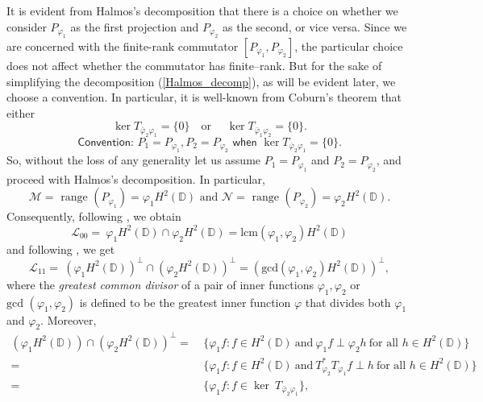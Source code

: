 \documentclass[12pt, a4 paper]{amsart}
\newcommand{\cll}{\mathcal{L}}
\newcommand{\clm}{\mathcal{M}}
\newcommand{\cln}{\mathcal{N}}
\newcommand{\D}{\mathbb{D}}
\theoremstyle{definition}
\theoremstyle{plain}
\theoremstyle{definition}
\numberwithin{equation}{section}
\let\phi=\varphi
\begin{document}
It is evident from Halmos's decomposition that there is a choice on whether we consider $P_{\phi_1}$  as the first projection and $P_{\phi_2}$ as the second, or vice versa. Since we are concerned with the finite-rank commutator $[P_{\phi_1}, P_{\phi_2}]$, the particular choice does not affect whether the commutator has finite--rank.  But for the sake of simplifying the decomposition (\ref{Halmos_decomp}), as will be evident later, we choose a convention. In particular, it is well-known from Coburn's theorem \cite{Coburn} that either
\[
\ker T_{\bar \phi_2 \phi_1} = \{0\} \quad \text{or }\quad \ker T_{\bar \phi_1 \phi_2} = \{0\}. 
\]
\begin{equation}\label{convention}
\textsf{Convention: } P_1 = P_{\phi_1}, P_2 = P_{\phi_2} \textsf{ when } 
\ker T_{\bar \phi_2 \phi_1} = \{0\}.
\end{equation}
So, without the loss of any generality let us assume $P_1 = P_{\phi_1}$ and $P_2 = P_{\phi_2}$, and proceed with Halmos's decomposition. In particular, 
\[
\clm=\text{ range } (P_{\phi_1})=\phi_1 H^2(\mathbb{D}) \text{ and } \cln=\text{ range }(P_{\phi_2})=\phi_2 H^2(\mathbb{D}).
\]
 Consequently, following \cite[Corollary 4.8]{GMR}, we obtain
\begin{equation*} 
    \cll_{00} =~\phi_1 H^2(\mathbb{D} )\cap\phi_2 H^2(\mathbb{D} )=\mbox{lcm}(\phi_1,\phi_2)H^2({\mathbb{D}} )
\end{equation*}
and following \cite[Corollary 5.9]{GMR}, we get
\begin{equation*}
 \cll_{11}=~\left(\phi_1 H^2(\mathbb{D} )\right)^{\perp}\cap\left(\phi_2 H^2(\mathbb{D} )\right)^{\perp}=\left(\mbox{gcd}(\phi_1, \phi_2)H^2({\mathbb{D}} )\right)^{\perp},
\end{equation*}
where the \textit{greatest common divisor} of a pair of inner functions $\phi_1, \phi_2$ or $\mbox{gcd }(\phi_1, \phi_2)$ is defined to be the greatest inner function $\phi$ that divides both $\phi_1$ and $\phi_2$.  
Moreover,
\begin{align*}
\left(\phi_1 H^2(\mathbb{D} )\right)\cap\left(\phi_2 H^2(\mathbb{D} )\right)^{\perp}
    =&~\{\phi_1f:f\in H^2(\mathbb{D} )~\text{and}~\phi_1f\perp \phi_2h~\text{for all }h\in H^2(\mathbb{D} )\}\\
    =&~\{\phi_1f:f\in H^2(\mathbb{D} )~\text{and}~T_{\phi_2}^*T_{\phi_1}f\perp h~\text{for all }h\in H^2(\mathbb{D} )\}\\
    =&~\{\phi_1f:f\in \ker~T_{\bar \phi_2 \phi_1}\},
\end{align*}
\end{document}

